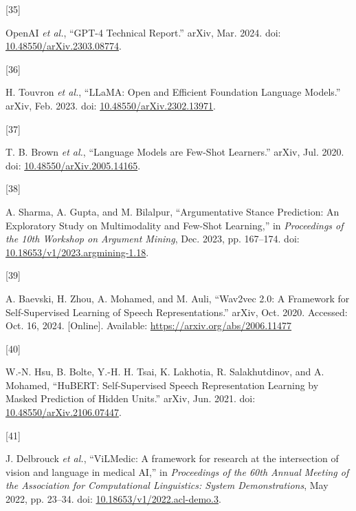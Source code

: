 \documentclass[twocolumn]{article}
\newlength{\cslhangindent}
\newlength{\csllabelwidth}
\newenvironment{CSLReferences}[2] %
 {\begin{list}{}{%
  \setlength{\itemindent}{0pt}
  \setlength{\leftmargin}{0pt}
  \setlength{\parsep}{0pt}
  \ifodd #1
   \setlength{\leftmargin}{\cslhangindent}
   \setlength{\itemindent}{-1\cslhangindent}
  \fi
  \setlength{\itemsep}{#2\baselineskip}}}
 {\end{list}}
\newcommand{\CSLLeftMargin}[1]{\parbox[t]{\csllabelwidth}{\strut#1\strut}}
\newcommand{\CSLRightInline}[1]{\parbox[t]{\linewidth - \csllabelwidth}{\strut#1\strut}}
\begin{document}
\begin{CSLReferences}{0}{0}
\CSLLeftMargin{{[}35{]} }%
\CSLRightInline{OpenAI \emph{et al.}, {``{GPT-4 Technical Report}.''}
arXiv, Mar. 2024. doi:
\href{https://doi.org/10.48550/arXiv.2303.08774}{10.48550/arXiv.2303.08774}.}

\CSLLeftMargin{{[}36{]} }%
\CSLRightInline{H. Touvron \emph{et al.}, {``{LLaMA}: {Open} and
{Efficient Foundation Language Models}.''} arXiv, Feb. 2023. doi:
\href{https://doi.org/10.48550/arXiv.2302.13971}{10.48550/arXiv.2302.13971}.}

\CSLLeftMargin{{[}37{]} }%
\CSLRightInline{T. B. Brown \emph{et al.}, {``Language {Models} are
{Few-Shot Learners}.''} arXiv, Jul. 2020. doi:
\href{https://doi.org/10.48550/arXiv.2005.14165}{10.48550/arXiv.2005.14165}.}

\CSLLeftMargin{{[}38{]} }%
\CSLRightInline{A. Sharma, A. Gupta, and M. Bilalpur, {``Argumentative
{Stance Prediction}: {An Exploratory Study} on {Multimodality} and
{Few-Shot Learning},''} in \emph{Proceedings of the 10th {Workshop} on
{Argument Mining}}, Dec. 2023, pp. 167--174. doi:
\href{https://doi.org/10.18653/v1/2023.argmining-1.18}{10.18653/v1/2023.argmining-1.18}.}

\CSLLeftMargin{{[}39{]} }%
\CSLRightInline{A. Baevski, H. Zhou, A. Mohamed, and M. Auli, {``Wav2vec
2.0: {A Framework} for {Self-Supervised Learning} of {Speech
Representations}.''} arXiv, Oct. 2020. Accessed: Oct. 16, 2024.
{[}Online{]}. Available: \url{https://arxiv.org/abs/2006.11477}}

\CSLLeftMargin{{[}40{]} }%
\CSLRightInline{W.-N. Hsu, B. Bolte, Y.-H. H. Tsai, K. Lakhotia, R.
Salakhutdinov, and A. Mohamed, {``{HuBERT}: {Self-Supervised Speech
Representation Learning} by {Masked Prediction} of {Hidden Units}.''}
arXiv, Jun. 2021. doi:
\href{https://doi.org/10.48550/arXiv.2106.07447}{10.48550/arXiv.2106.07447}.}

\CSLLeftMargin{{[}41{]} }%
\CSLRightInline{J. Delbrouck \emph{et al.}, {``{ViLMedic}: A framework
for research at the intersection of vision and language in medical
{AI},''} in \emph{Proceedings of the 60th {Annual Meeting} of the
{Association} for {Computational Linguistics}: {System Demonstrations}},
May 2022, pp. 23--34. doi:
\href{https://doi.org/10.18653/v1/2022.acl-demo.3}{10.18653/v1/2022.acl-demo.3}.}


\end{CSLReferences}
\end{document}
